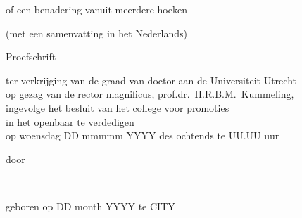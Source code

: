 \begin{titlepage}
\begin{center}
        {\Large\titlefont\titleshape of een benadering vanuit meerdere hoeken}

        (met een samenvatting in het Nederlands)

        \bigskip
        \bigskip

        
        {\Large\titlefont Proefschrift}

        \bigskip
        \bigskip


        ter verkrijging van de graad van doctor aan de Universiteit Utrecht\\[\medskipamount]
        op gezag van de rector magnificus, prof.dr.\ H.R.B.M.~Kummeling,\\[\medskipamount]
        ingevolge het besluit van het college voor promoties\\[\medskipamount]
        in het openbaar te verdedigen\\[\medskipamount]
        op woensdag DD mmmmm YYYY  des ochtends te UU.UU uur

        \bigskip
        \bigskip

        door

        \bigskip
        \bigskip



        {\makeatletter
        \Large\titlefont\bfseries\@firstname~{\titleshape\@lastname}
        \makeatother}



        \bigskip
        \bigskip



        geboren op DD month YYYY te CITY



\end{center}
\end{titlepage}
